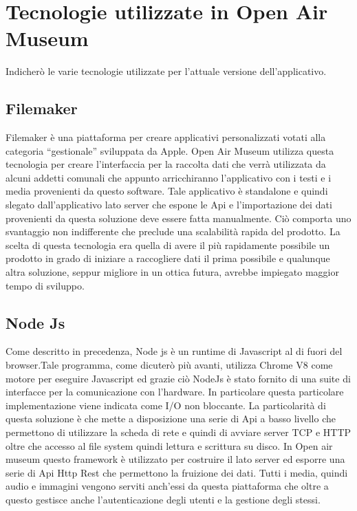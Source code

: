\section{Tecnologie utilizzate in Open Air Museum}\vspace{5mm}

Indicherò le varie tecnologie utilizzate per l'attuale versione dell'applicativo.\vspace{5mm}

\subsection{Filemaker}\vspace{5mm}

Filemaker è una piattaforma per creare applicativi personalizzati votati alla categoria “gestionale” sviluppata da Apple. Open Air Museum utilizza questa tecnologia per creare l’interfaccia per la raccolta dati che verrà utilizzata da alcuni addetti comunali che appunto arricchiranno l’applicativo con i testi e i media provenienti da questo software. Tale applicativo è standalone e quindi slegato dall’applicativo lato server che espone le Api e l’importazione dei dati provenienti da questa soluzione deve essere fatta manualmente. Ciò comporta uno svantaggio non indifferente che preclude una scalabilità rapida del prodotto. La scelta di questa tecnologia era quella di avere il più rapidamente possibile un prodotto in grado di iniziare a raccogliere dati il prima possibile e qualunque altra soluzione, seppur migliore in un ottica futura, avrebbe impiegato maggior tempo di sviluppo.\vspace{5mm}

\subsection{Node Js}\vspace{5mm}

	Come descritto in precedenza, Node js è un runtime di Javascript al di fuori del browser.Tale programma, come dicuterò più avanti, utilizza Chrome V8\cite{V8} come motore per eseguire Javascript ed grazie ciò NodeJs è stato fornito di una suite di interfacce per la comunicazione con l'hardware. In particolare questa particolare implementazione viene indicata come I/O non bloccante\cite{AsincIO}. La particolarità di questa soluzione è che mette a disposizione una serie di Api a basso livello che permettono di utilizzare la scheda di rete e quindi di avviare server TCP e HTTP oltre che accesso al file system quindi lettura e scrittura su disco. In Open air museum questo framework è utilizzato per costruire il lato server ed esporre una serie di Api Http Rest che permettono la fruizione dei dati. Tutti i media, quindi audio e immagini vengono serviti anch’essi da questa piattaforma che oltre a questo gestisce anche l’autenticazione degli utenti e la gestione degli stessi. \vspace{5mm}
	
